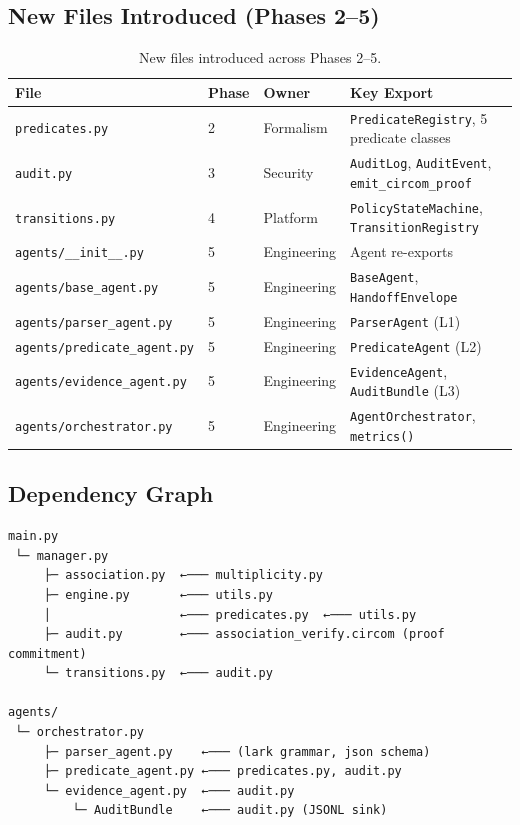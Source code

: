 \documentclass[12pt,letterpaper]{article}
\theoremstyle{definition}
\theoremstyle{remark}
\begin{document}
\subsection{New Files Introduced (Phases 2–5)}

\begin{table}[H]
\centering
\small
\begin{tabular}{@{}llll@{}}
\toprule
\textbf{File} & \textbf{Phase} & \textbf{Owner} & \textbf{Key Export} \\
\midrule
\texttt{predicates.py}               & 2 & Formalism  & \texttt{PredicateRegistry}, 5 predicate classes \\
\texttt{audit.py}                    & 3 & Security   & \texttt{AuditLog}, \texttt{AuditEvent}, \texttt{emit\_circom\_proof} \\
\texttt{transitions.py}              & 4 & Platform   & \texttt{PolicyStateMachine}, \texttt{TransitionRegistry} \\
\texttt{agents/\_\_init\_\_.py}      & 5 & Engineering & Agent re-exports \\
\texttt{agents/base\_agent.py}       & 5 & Engineering & \texttt{BaseAgent}, \texttt{HandoffEnvelope} \\
\texttt{agents/parser\_agent.py}     & 5 & Engineering & \texttt{ParserAgent} (L1) \\
\texttt{agents/predicate\_agent.py}  & 5 & Engineering & \texttt{PredicateAgent} (L2) \\
\texttt{agents/evidence\_agent.py}   & 5 & Engineering & \texttt{EvidenceAgent}, \texttt{AuditBundle} (L3) \\
\texttt{agents/orchestrator.py}      & 5 & Engineering & \texttt{AgentOrchestrator}, \texttt{metrics()} \\
\bottomrule
\end{tabular}
\caption{New files introduced across Phases 2–5.}
\end{table}

\subsection{Dependency Graph}

\begin{noteboxtc}
\begin{lstlisting}[style=jsonlstyle, caption={Module dependency graph (simplified)}, label={lst:deps}]
main.py
 └─ manager.py
     ├─ association.py  ←─── multiplicity.py
     ├─ engine.py       ←─── utils.py
     │                  ←─── predicates.py  ←─── utils.py
     ├─ audit.py        ←─── association_verify.circom (proof commitment)
     └─ transitions.py  ←─── audit.py

agents/
 └─ orchestrator.py
     ├─ parser_agent.py    ←─── (lark grammar, json schema)
     ├─ predicate_agent.py ←─── predicates.py, audit.py
     └─ evidence_agent.py  ←─── audit.py
         └─ AuditBundle    ←─── audit.py (JSONL sink)
\end{lstlisting}
\end{noteboxtc}
\end{document}
